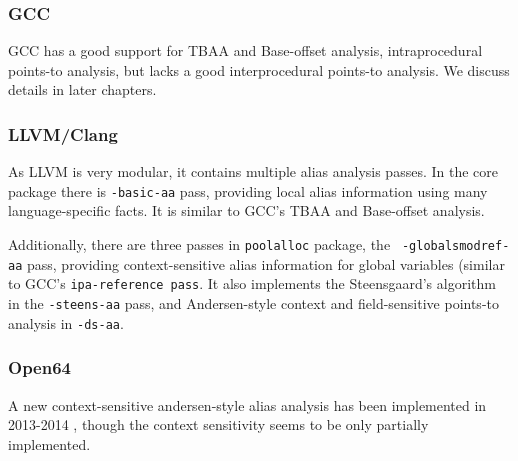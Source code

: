 \subsubsection{GCC}

GCC has a good support for TBAA and Base-offset analysis, intraprocedural
points-to analysis, but lacks a good interprocedural points-to analysis. We
discuss details in later chapters.

\subsubsection{LLVM/Clang}

As LLVM is very modular, it contains multiple alias analysis passes. In the core
package there is {\tt -basic-aa} pass, providing local alias information using
many language-specific facts. It is similar to GCC's TBAA and Base-offset
analysis.

Additionally, there are three passes in {\tt poolalloc} package, the {\tt
-globalsmodref-aa} pass, providing context-sensitive alias information for
global variables (similar to GCC's {\tt ipa-reference pass}. It also implements
the Steensgaard's algorithm in the {\tt -steens-aa} pass, and Andersen-style
context and field-sensitive points-to analysis in {\tt -ds-aa}.

\subsubsection{Open64}

A new context-sensitive andersen-style alias analysis has been implemented in
2013-2014 \cite{sui2014}, though the context sensitivity seems to be only
partially implemented.

